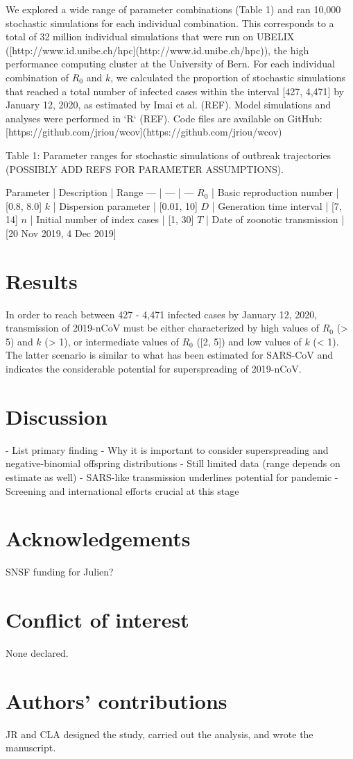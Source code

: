 \documentclass{article}
\begin{document}
We explored a wide range of parameter combinations (Table 1) and ran 10,000 stochastic simulations for each individual combination. This corresponds to a total of 32 million individual simulations that were run on UBELIX ([http://www.id.unibe.ch/hpc](http://www.id.unibe.ch/hpc)), the high performance computing cluster at the University of Bern. For each individual combination of $R_0$ and $k$, we calculated the proportion of stochastic simulations that reached a total number of infected cases within the interval [427, 4,471] by January 12, 2020, as estimated by Imai et al. (REF). Model simulations and analyses were performed in `R` (REF). Code files are available on GitHub: [https://github.com/jriou/wcov](https://github.com/jriou/wcov)

Table 1: Parameter ranges for stochastic simulations of outbreak trajectories (POSSIBLY ADD REFS FOR PARAMETER ASSUMPTIONS).

Parameter | Description | Range
--- | --- | ---
$R_0$ | Basic reproduction number | [0.8, 8.0]
$k$ | Dispersion parameter | [0.01, 10]
$D$ | Generation time interval | [7, 14]
$n$ | Initial number of index cases | [1, 30]
$T$ | Date of zoonotic transmission | [20 Nov 2019, 4 Dec 2019]

\section{Results}
In order to reach between 427 - 4,471 infected cases by January 12, 2020, transmission of 2019-nCoV must be either characterized by high values of $R_0$ (> 5) and $k$ (> 1), or intermediate values of $R_0$ ([2, 5]) and low values of $k$ (< 1). The latter scenario is similar to what has been estimated for SARS-CoV and indicates the considerable potential for superspreading of 2019-nCoV.

\section{Discussion}
- List primary finding
- Why it is important to consider superspreading and negative-binomial offspring distributions
- Still limited data (range depends on estimate as well)
- SARS-like transmission underlines potential for pandemic
- Screening and international efforts crucial at this stage

\section{Acknowledgements}
SNSF funding for Julien?

\section{Conflict of interest}
None declared.

\section{Authors’ contributions}

JR and CLA designed the study, carried out the analysis, and wrote the manuscript.
\end{document}

